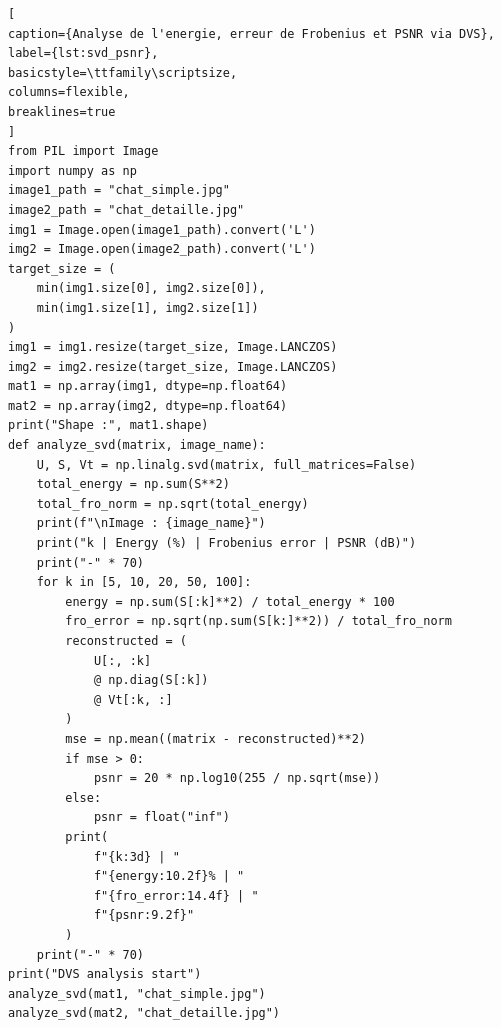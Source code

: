 \documentclass[12pt]{report}
\begin{document}
\begin{lstlisting}[
caption={Analyse de l'energie, erreur de Frobenius et PSNR via DVS},
label={lst:svd_psnr},
basicstyle=\ttfamily\scriptsize,
columns=flexible,
breaklines=true
]
from PIL import Image
import numpy as np
image1_path = "chat_simple.jpg"
image2_path = "chat_detaille.jpg"
img1 = Image.open(image1_path).convert('L')
img2 = Image.open(image2_path).convert('L')
target_size = (
    min(img1.size[0], img2.size[0]),
    min(img1.size[1], img2.size[1])
)
img1 = img1.resize(target_size, Image.LANCZOS)
img2 = img2.resize(target_size, Image.LANCZOS)
mat1 = np.array(img1, dtype=np.float64)
mat2 = np.array(img2, dtype=np.float64)
print("Shape :", mat1.shape)
def analyze_svd(matrix, image_name):
    U, S, Vt = np.linalg.svd(matrix, full_matrices=False)
    total_energy = np.sum(S**2)
    total_fro_norm = np.sqrt(total_energy)
    print(f"\nImage : {image_name}")
    print("k | Energy (%) | Frobenius error | PSNR (dB)")
    print("-" * 70)
    for k in [5, 10, 20, 50, 100]:
        energy = np.sum(S[:k]**2) / total_energy * 100
        fro_error = np.sqrt(np.sum(S[k:]**2)) / total_fro_norm
        reconstructed = (
            U[:, :k]
            @ np.diag(S[:k])
            @ Vt[:k, :]
        )
        mse = np.mean((matrix - reconstructed)**2)
        if mse > 0:
            psnr = 20 * np.log10(255 / np.sqrt(mse))
        else:
            psnr = float("inf")
        print(
            f"{k:3d} | "
            f"{energy:10.2f}% | "
            f"{fro_error:14.4f} | "
            f"{psnr:9.2f}"
        )
    print("-" * 70)
print("DVS analysis start")
analyze_svd(mat1, "chat_simple.jpg")
analyze_svd(mat2, "chat_detaille.jpg")
\end{lstlisting}
\clearpage
\end{document}
